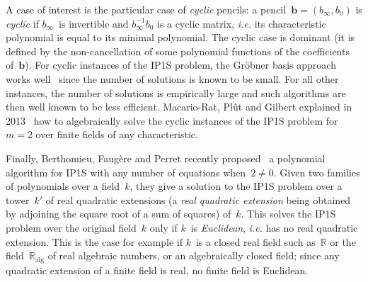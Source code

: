 \documentclass{article}%
\begin{document}
A case of interest is the particular case of \emph{cyclic} pencils: a
pencil~$\bm{b} = (b_{∞}, b_0)$ is \emph{cyclic} if $b_{∞}$~is invertible
and $b_{∞}^{-1} b_{0}$ is a cyclic matrix, \emph{i.e.} its characteristic
polynomial is equal to its minimal polynomial. The cyclic case is
dominant (it is defined by the non-cancellation of some polynomial
functions of the coefficients of~$\bm{b}$). For cyclic instances of the
IP1S problem, the Gröbner basis approach works
well~\cite{DBLP:conf/pkc/BouillaguetFFP11} since the number of solutions
is known to be small. For all other instances, the number of solutions is
empirically large and such algorithms are then well known to be less
efficient. Macario-Rat, Plût and Gilbert explained in 2013~\cite{MPG2013}
how to algebraically solve the cyclic instances of the IP1S problem for
$m=2$ over finite fields of any characteristic.

Finally, Berthomieu, Faugère and Perret
recently proposed~\cite{DBLP:journals/corr/BerthomieuFP13}
a polynomial algorithm for IP1S with any number of equations when~$2 ≠ 0$.
Given two families of polynomials over a field~$k$,
they give a solution to the IP1S problem
over a tower~$k'$ of real quadratic extensions
(a \emph{real quadratic extension} being obtained by
adjoining the square root of a sum of squares) of~$k$.
This solves the IP1S problem over the original field~$k$ only if
$k$~is \emph{Euclidean}, \emph{i.e.} has no real quadratic extension.
This is the case for example if $k$~is a closed real field such as~$ℝ$
or the field~$ℝ_{\mathrm{alg}}$ of real algebraic numbers,
or an algebraically closed field;
since any quadratic extension of a finite field is real,
no finite field is Euclidean.
\end{document}
